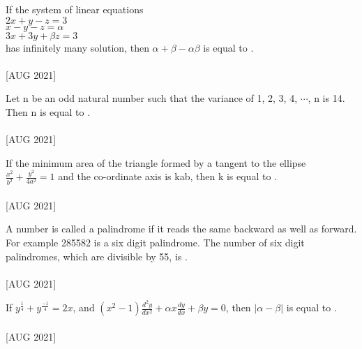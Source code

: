     \item If the system of linear equations\\ $2x + y - z = 3$\\ $x - y - z = \alpha$\\ $3x + 3y + \beta z = 3$\\ has infinitely many solution, then $\alpha + \beta - \alpha\beta$ is equal to \underline{\hspace{1cm}}. \\\\\hfill{[AUG 2021]}
    \item Let n be an odd natural number such that the variance of 1, 2, 3, 4, $\cdots$, n is 14. Then n is equal to \underline{\hspace{1cm}}. \\\\\hfill{[AUG 2021]}
    \item If the minimum area of the triangle formed by a tangent to the ellipse $\frac{x^{2}}{b^{2}} + \frac{y^{2}}{4a^{2}} = 1$ and the co-ordinate axis is kab, then k is equal to \underline{\hspace{1cm}}. \\\\\hfill{[AUG 2021]}
    \item A number is called a palindrome if it reads the same backward as well as forward. For example 285582 is a six digit palindrome. The number of six digit palindromes, which are divisible by 55, is \underline{\hspace{1cm}}. \\\\\hfill{[AUG 2021]}
    \item If $y^{\frac{1}{4}} + y^{\frac{-1}{4}} = 2x$, and $(x^{2} - 1)\frac{d^{2}y}{dx^{2}} + \alpha x\frac{dy}{dx} + \beta y= 0$, then $|\alpha - \beta|$ is equal to \underline{\hspace{1cm}}. \\\\\hfill{[AUG 2021]}

